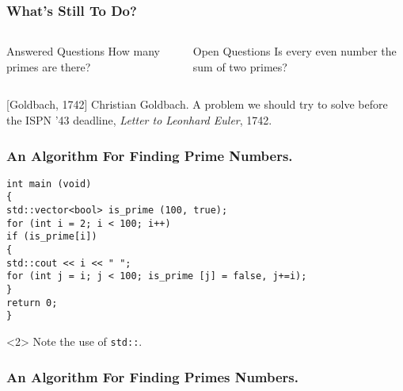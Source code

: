 \documentclass[11pt]{beamer}
\begin{document}
\begin{frame}
\frametitle{What’s Still To Do?}
\begin{columns}
	\begin{block}{Answered Questions}
		How many primes are there?
	\end{block}
	\begin{block}{Open Questions}
		Is every even number the sum of two primes?\cite{Goldbach1742}
	\end{block}
\end{columns}
\end{frame}


\begin{thebibliography}{10}
	[Goldbach, 1742]
	Christian Goldbach.
	\newblock A problem we should try to solve before the ISPN ’43 deadline,
	\newblock \emph{Letter to Leonhard Euler}, 1742.
\end{thebibliography}

\begin{frame}[fragile]
\frametitle{An Algorithm For Finding Prime Numbers.}
\begin{verbatim}
int main (void)
{
std::vector<bool> is_prime (100, true);
for (int i = 2; i < 100; i++)
if (is_prime[i])
{
std::cout << i << " ";
for (int j = i; j < 100; is_prime [j] = false, j+=i);
}
return 0;
}
\end{verbatim}
\begin{uncoverenv}<2>
	Note the use of \verb|std::|.
\end{uncoverenv}
\end{frame}

\begin{frame}[fragile]
\frametitle{An Algorithm For Finding Primes Numbers.}
\begin{semiverbatim}
\end{semiverbatim}
\end{frame}
\end{document}
